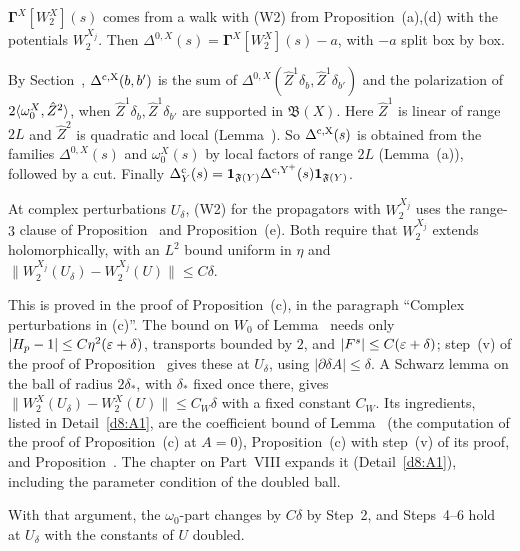 \begin{detail}
\begin{step}
\end{step}
\begin{step}
$\boldsymbol\Gamma^X[W_2^X](s)$ comes from a walk with (W2) from Proposition~(a),(d) with the potentials $W_2^{X_j}$. Then $\Delta^{0,X}(s)=\boldsymbol\Gamma^X[W_2^X](s)-a$, with $-a$ split box by box.

By Section~, $\Delta^{\rm c,X}(b,b')$ is the sum of $\Delta^{0,X}(\hat Z^1\delta_b,\hat Z^1\delta_{b'})$ and the polarization of $2\langle \omega_0^X,\hat Z^2\rangle$, when $\hat Z^1\delta_b,\hat Z^1\delta_{b'}$ are supported in $\mathfrak B(X)$. Here $\hat Z^1$ is linear of range $2L$ and $\hat Z^2$ is quadratic and local (Lemma~). So $\Delta^{\rm c,X}(s)$ is obtained from the families $\Delta^{0,X}(s)$ and $\omega_0^X(s)$ by local factors of range $2L$ (Lemma~(a)), followed by a cut. Finally $\Delta^{\rm c}_Y(s)=\mathbf 1_{\mathfrak F(Y)}\Delta^{\rm c,Y^+}(s)\mathbf 1_{\mathfrak F(Y)}$.
\end{step}
\begin{step}
At complex perturbations $U_\delta$, (W2) for the propagators with $W_2^{X_j}$ uses the range-$3$ clause of Proposition~ and Proposition~(e). Both require that $W_2^{X_j}$ extends holomorphically, with an $L^2$ bound uniform in $\eta$ and $\|W_2^{X_j}(U_\delta)-W_2^{X_j}(U)\|\le C\delta$.

This is proved in the proof of Proposition~(c), in the paragraph ``Complex perturbations in (c)''. The bound on $W_0$ of Lemma~ needs only $|H_p-1|\le C\eta^2(\varepsilon+\delta)$, transports bounded by $2$, and $|F^s|\le C(\varepsilon+\delta)$; step~(v) of the proof of Proposition~ gives these at $U_\delta$, using $|\partial\delta\!A|\le\delta$. A Schwarz lemma on the ball of radius $2\delta_*$, with $\delta_*$ fixed once there, gives $\|W_2^X(U_\delta)-W_2^X(U)\|\le C_W\delta$ with a fixed constant $C_W$. Its ingredients, listed in Detail~\ref{d8:A1}, are the coefficient bound of Lemma~ (the computation of the proof of Proposition~(c) at $A=0$), Proposition~(c) with step~(v) of its proof, and Proposition~. The chapter on Part~VIII expands it (Detail~\ref{d8:A1}), including the parameter condition of the doubled ball.

With that argument, the $\omega_0$-part changes by $C\delta$ by Step~2, and Steps~4--6 hold at $U_\delta$ with the constants of $U$ doubled.
\end{step}
\end{detail}

